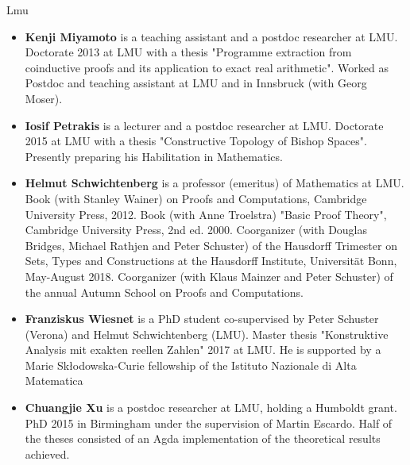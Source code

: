 \begin{sitedescription}{Lmu}
\begin{itemize}
\item \textbf{Kenji Miyamoto} is a teaching assistant and a postdoc
  researcher at LMU.  Doctorate 2013 at LMU with a thesis "Programme
  extraction from coinductive proofs and its application to exact real
  arithmetic".  Worked as Postdoc and teaching assistant at LMU and in
  Innsbruck (with Georg Moser).

\item \textbf{Iosif Petrakis} is a lecturer and a postdoc researcher
  at LMU.  Doctorate 2015 at LMU with a thesis "Constructive Topology
  of Bishop Spaces".  Presently preparing his Habilitation in
  Mathematics.

\item \textbf{Helmut Schwichtenberg} is a professor (emeritus) of
  Mathematics at LMU.  Book (with Stanley Wainer) on Proofs and
  Computations, Cambridge University Press, 2012.  Book (with Anne
  Troelstra) "Basic Proof Theory", Cambridge University Press, 2nd
  ed. 2000.  Coorganizer (with Douglas Bridges, Michael Rathjen and
  Peter Schuster) of the Hausdorff Trimester on Sets, Types and
  Constructions at the Hausdorff Institute, Universit\"at Bonn,
  May-August 2018.  Coorganizer (with Klaus Mainzer and Peter
  Schuster) of the annual Autumn School on Proofs and Computations.

\item \textbf{Franziskus Wiesnet} is a PhD student co-supervised by
  Peter Schuster (Verona) and Helmut Schwichtenberg (LMU).  Master
  thesis "Konstruktive Analysis mit exakten reellen Zahlen" 2017 at
  LMU.  He is supported by a Marie Sk{\l}odowska-Curie fellowship of
  the Istituto Nazionale di Alta Matematica

\item \textbf{Chuangjie Xu} is a postdoc researcher at LMU, holding a
  Humboldt grant.  PhD 2015 in Birmingham under the supervision of
  Martin Escardo.  Half of the theses consisted of an Agda
  implementation of the theoretical results achieved.

\end{itemize}



\end{sitedescription}

